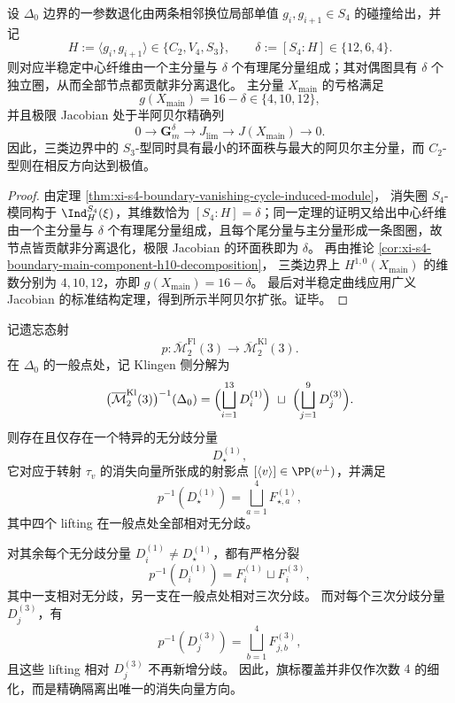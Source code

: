 \begin{corollary}\label{cor:derived-m2-level3-subgroup-index-controls-degeneration}
设 \(\Delta_0\) 边界的一参数退化由两条相邻换位局部单值 \(g_i,g_{i+1}\in S_4\) 的碰撞给出，并记
\[
H:=\langle g_i,g_{i+1}\rangle\in\{C_2,V_4,S_3\},
\qquad
\delta:=[S_4:H]\in\{12,6,4\}.
\]
则对应半稳定中心纤维由一个主分量与 \(\delta\) 个有理尾分量组成；其对偶图具有 \(\delta\) 个独立圈，从而全部节点都贡献非分离退化。
主分量 \(X_{\mathrm{main}}\) 的亏格满足
\[
g(X_{\mathrm{main}})=16-\delta\in\{4,10,12\},
\]
并且极限 Jacobian 处于半阿贝尔精确列
\[
0\longrightarrow \mathbf G_m^\delta
\longrightarrow J_{\lim}
\longrightarrow J(X_{\mathrm{main}})
\longrightarrow 0.
\]
因此，三类边界中的 \(S_3\)-型同时具有最小的环面秩与最大的阿贝尔主分量，而 \(C_2\)-型则在相反方向达到极值。
\end{corollary}

\begin{proof}
由定理 \ref{thm:xi-s4-boundary-vanishing-cycle-induced-module}，
消失圈 \(S_4\)-模同构于 \(\Ind_H^{S_4}(\xi)\)，其维数恰为 \([S_4:H]=\delta\)；同一定理的证明又给出中心纤维由一个主分量与 \(\delta\) 个有理尾分量组成，且每个尾分量与主分量形成一条图圈，故节点皆贡献非分离退化，极限 Jacobian 的环面秩即为 \(\delta\)。
再由推论 \ref{cor:xi-s4-boundary-main-component-h10-decomposition}，
三类边界上 \(H^{1,0}(X_{\mathrm{main}})\) 的维数分别为 \(4,10,12\)，亦即
\(
g(X_{\mathrm{main}})=16-\delta
\)。
最后对半稳定曲线应用广义 Jacobian 的标准结构定理，得到所示半阿贝尔扩张。证毕。
\end{proof}

\begin{theorem}\label{thm:derived-m2-level3-delta0-flag-vanishing-line-memory}
记遗忘态射
\[
p:\overline{\mathcal M}_2^{\mathrm{Fl}}(3)\longrightarrow \overline{\mathcal M}_2^{\mathrm{Kl}}(3).
\]
在 \(\Delta_0\) 的一般点处，记 Klingen 侧分解为
\[
\bigl(\overline{\mathcal M}_2^{\mathrm{Kl}}(3)\bigr)^{-1}(\Delta_0)
=
\Bigl(\bigsqcup_{i=1}^{13}D_i^{(1)}\Bigr)\ \sqcup\ \Bigl(\bigsqcup_{j=1}^{9}D_j^{(3)}\Bigr).
\]
则存在且仅存在一个特异的无分歧分量
\[
D_\star^{(1)},
\]
它对应于转射 \(\tau_v\) 的消失向量所张成的射影点 \([\langle v\rangle]\in \PP(v^\perp)\)，并满足
\[
p^{-1}(D_\star^{(1)})=\bigsqcup_{a=1}^{4}F_{\star,a}^{(1)},
\]
其中四个 lifting 在一般点处全部相对无分歧。

对其余每个无分歧分量 \(D_i^{(1)}\neq D_\star^{(1)}\)，都有严格分裂
\[
p^{-1}(D_i^{(1)})=F_i^{(1)}\sqcup F_i^{(3)},
\]
其中一支相对无分歧，另一支在一般点处相对三次分歧。
而对每个三次分歧分量 \(D_j^{(3)}\)，有
\[
p^{-1}(D_j^{(3)})=\bigsqcup_{b=1}^{4}F_{j,b}^{(3)},
\]
且这些 lifting 相对 \(D_j^{(3)}\) 不再新增分歧。
因此，旗标覆盖并非仅作次数 \(4\) 的细化，而是精确隔离出唯一的消失向量方向。
\end{theorem}

